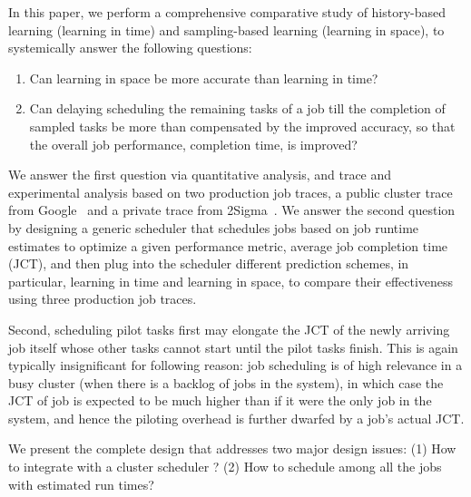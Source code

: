 In this paper, we perform a comprehensive comparative study
of history-based learning (learning in time) and sampling-based learning
(learning in space), to systemically answer the following questions:
\begin{enumerate}
\item Can learning in space be more accurate than learning in time?
\item Can {delaying scheduling} the remaining tasks of a job till the completion
of sampled tasks be more than compensated by the improved accuracy, so
that the overall job performance, \eg completion time, is improved?
\end{enumerate}

We answer the first question via quantitative analysis, and trace and
experimental analysis based on two production job traces, a public
cluster trace from Google~\cite{googleTraceGithub} and a private trace
from 2Sigma~\cite{2Sigma:website}.  We answer the second
question by designing a generic scheduler that schedules jobs based on
job runtime estimates to optimize a given performance metric, \eg
average job completion time (JCT), and then plug into the scheduler
different prediction schemes, in particular, learning in time and
learning in space, to compare their effectiveness
using three production job traces.

  Second, scheduling pilot tasks first may elongate the JCT of the newly
arriving job itself whose other tasks cannot start until the pilot
tasks finish. This is again typically insignificant for following reason:
job scheduling is of high relevance in a busy
cluster (when there is a backlog of jobs in the system), in which
case the JCT of job is expected to be much higher than if it were
the only job in the system, and hence the piloting overhead is
further dwarfed by a job's actual JCT.

We present the complete \name design that addresses two major design issues:
(1) How to integrate \namepredict with a cluster scheduler \gs?
(2) How to schedule among all the jobs with estimated run times?


